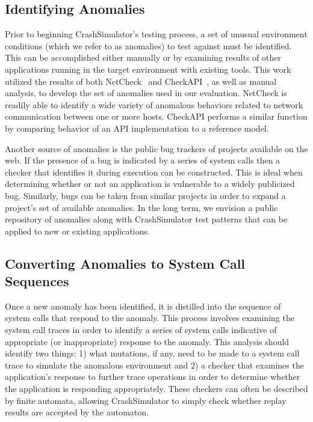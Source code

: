     

    \subsection{Identifying Anomalies}
    
    Prior to beginning CrashSimulator's testing
    process, a set of unusual environment conditions (which we refer to as anomalies)
    to test against
    must be identified.  This can be accomplished either manually or by
    examining results of other applications running in the target environment with existing
    tools.  This work utilized the results of both
    NetCheck~\cite{Zhuang_NSDI_2014} and CheckAPI~\cite{rasley2015detecting}, as
    well as manual analysis, to develop the set of anomalies used in our
    evaluation.  NetCheck is readily able to identify a wide variety of anomalous
    behaviors related to network communication between one or more
    hosts.  CheckAPI performs a similar function by comparing behavior of an API
    implementation to a reference model.

    Another source of anomalies is the public bug trackers of projects available
    on the web.  If the presence of a bug is indicated by a series of system
    calls then a checker that identifies it during execution can be constructed. This
    is ideal when determining whether or not an application is vulnerable to a
    widely publicized bug.  Similarly, bugs can be taken from similar projects
    in order to expand a project's set of available anomalies.
    In the long term, we envision a public repository of anomalies along with CrashSimulator test patterns that can be applied to new or existing applications.

    \subsection{Converting Anomalies to System Call Sequences}

    Once a new anomaly has been identified, it is distilled into the sequence of
    system calls that respond to the anomaly.  This process
    involves examining the system call traces %
    in order to
    identify a series of system calls indicative of appropriate (or inappropriate)
    response to the anomaly.
    This analysis should identify two things: 1) what mutations, if any, need to be
    made to a system call trace to simulate the anomalous environment and 2) a checker that examines the application's response to further trace operations in order to determine whether the application is responding appropriately. These checkers can often be 
    described by finite automata, allowing CrashSimulator to simply check
    whether replay results are accepted by the automaton.


